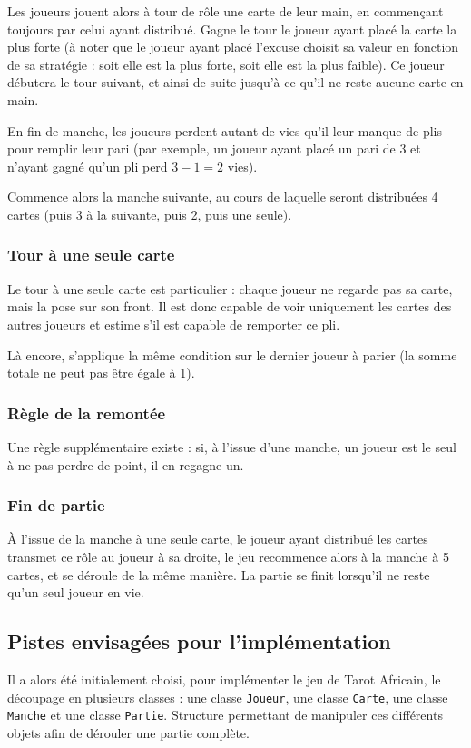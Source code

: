         Les joueurs jouent alors à tour de rôle une carte de leur main, en commençant toujours par celui ayant distribué.
         Gagne le tour le joueur ayant placé la carte la plus forte (à noter que le joueur ayant placé l'excuse choisit sa valeur en fonction de sa stratégie : soit elle est la plus forte, soit elle est la plus faible).
         Ce joueur débutera le tour suivant, et ainsi de suite jusqu'à ce qu'il ne reste aucune carte en main.

         En fin de manche, les joueurs perdent autant de vies qu'il leur manque de plis pour remplir leur pari (par exemple, un joueur ayant placé un pari de 3 et n'ayant gagné qu'un pli perd $3-1 = 2$ vies).

         Commence alors la manche suivante, au cours de laquelle seront distribuées 4 cartes (puis 3 à la suivante, puis 2, puis une seule).
      \subsubsection{Tour à une seule carte}
         Le tour à une seule carte est particulier : chaque joueur ne regarde pas sa carte, mais la pose sur son front.
         Il est donc capable de voir uniquement les cartes des autres joueurs et estime s'il est capable de remporter ce pli.

         Là encore, s'applique la même condition sur le dernier joueur à parier (la somme totale ne peut pas être égale à 1).

      \subsubsection{Règle de la \og remontée \fg{}}
         Une règle supplémentaire existe : si, à l'issue d'une manche, un joueur est le seul à ne pas perdre de point, il en regagne un.

      \subsubsection{Fin de partie}
         À l'issue de la manche à une seule carte, le joueur ayant distribué les cartes transmet ce rôle au joueur à sa droite, le jeu recommence alors à la manche à 5 cartes, et se déroule de la même manière.
         La partie se finit lorsqu'il ne reste qu'un seul joueur en vie.

   \subsection{Pistes envisagées pour l'implémentation}\label{subsec:pistes-envisagées-pour-l'implémentation}
      Il a alors été initialement choisi, pour implémenter le jeu de Tarot Africain, le découpage en plusieurs classes : une classe \texttt{Joueur}, une classe \texttt{Carte}, une classe \texttt{Manche} et une classe \texttt{Partie}.
      Structure permettant de manipuler ces différents objets afin de dérouler une partie complète.

